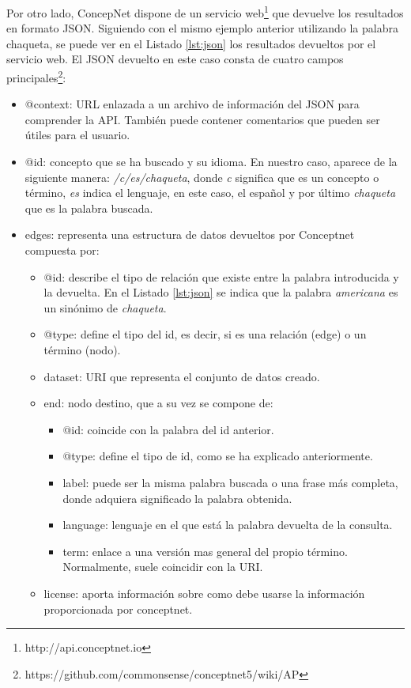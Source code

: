Por otro lado, ConcepNet dispone de un servicio web\footnote{http://api.conceptnet.io} que devuelve los resultados en formato JSON. Siguiendo con el mismo ejemplo anterior utilizando la palabra chaqueta, se puede ver en el Listado \ref{lst:json} los resultados devueltos por el servicio web. El JSON devuelto en este caso consta de cuatro campos principales\footnote{https://github.com/commonsense/conceptnet5/wiki/AP}:
\begin{itemize}
	\item @context: URL enlazada a un archivo de información del JSON para comprender la API. También puede contener comentarios que pueden ser útiles para el usuario.
	\item @id: concepto que se ha buscado y su idioma. En nuestro caso, aparece de la siguiente manera: \textit{/c/es/chaqueta}, donde  \textit{c} significa que es un concepto o término,  \textit{es} indica el lenguaje, en este caso, el español y por último \textit{chaqueta} que es la palabra buscada.
	\item edges: representa una estructura de datos devueltos por Conceptnet compuesta por:
	\begin{itemize}
		\item @id: describe el tipo de relación que existe entre la palabra introducida y la devuelta. En el Listado \ref{lst:json} se indica que la palabra \textit{americana} es un sinónimo de \textit{chaqueta}.
		\item @type: define el tipo del id, es decir, si es una relación (edge) o un término (nodo).
		\item dataset: URI que representa el conjunto de datos creado.
		\item end: nodo destino, que a su vez se compone de:	
		\begin{itemize}
			\item @id: coincide con la palabra del id anterior.
			\item @type: define el tipo de id, como se ha explicado anteriormente.
			\item label: puede ser la misma palabra buscada o una frase más completa, donde adquiera significado la palabra obtenida.
			\item language: lenguaje en el que está la palabra devuelta de la consulta.
			\item term: enlace a una versión mas general del propio término. Normalmente, suele coincidir con la URI.			
		\end{itemize}
		\item license: aporta información sobre como debe usarse la información proporcionada por conceptnet.

\end{itemize}
\end{itemize}
